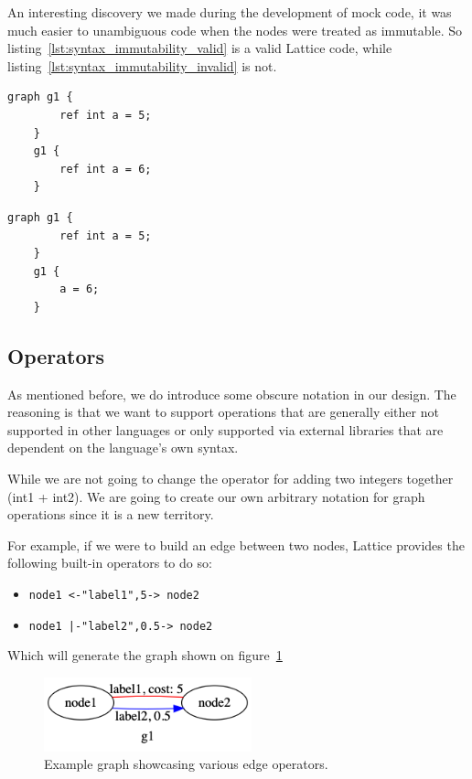 An interesting discovery we made during the development of mock code, it was much easier to unambiguous code
when the nodes were treated as immutable.
So listing~\ref{lst:syntax_immutability_valid} is a valid Lattice code, while listing~\ref{lst:syntax_immutability_invalid} is not.

\begin{lstlisting}[caption={Valid destruction and recreation of nodes.},captionpos=b,label={lst:syntax_immutability_valid}]
    graph g1 {
        ref int a = 5;
    }
    g1 {
        ref int a = 6;
    }
\end{lstlisting}

\begin{lstlisting}[caption={Code violating the immutability of nodes.},captionpos=b,label={lst:syntax_immutability_invalid}]
    graph g1 {
        ref int a = 5;
    }
    g1 {
        a = 6;
    }
\end{lstlisting}


\subsection{Operators}\label{subsec:syntax_operators}
As mentioned before, we do introduce some obscure notation in our design.
The reasoning is that we want to support operations that are generally either not supported in other languages
or only supported via external libraries that are dependent on the language's own syntax.

While we are not going to change the operator for adding two integers together (int1 + int2).
We are going to create our own arbitrary notation for graph operations since it is a new territory.

For example, if we were to build an edge between two nodes,
Lattice provides the following built-in operators to do so:

\begin{itemize}
    \item \lstinline{node1 <-"label1",5-> node2}
    \item \lstinline{node1 |-"label2",0.5-> node2}
\end{itemize}

Which will generate the graph shown on figure~\ref{fig:relation_basic_operator}
\begin{figure}[H]
    \centering
    \includegraphics[width=6cm]{figures/syntax_section/syntax_rel_basic}
    \caption{Example graph showcasing various edge operators.}
    \label{fig:relation_basic_operator}
\end{figure}


